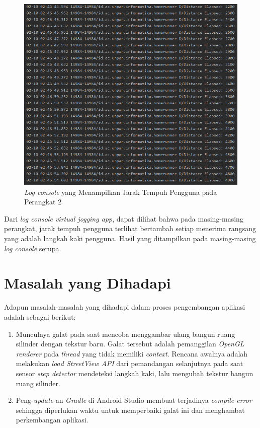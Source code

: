 \begin{figure}[h]
	\centering	\includegraphics[scale=1]
	{Gambar/asus-zenfone-2-exp.png}
	\caption{\textit{Log console} yang Menampilkan Jarak Tempuh Pengguna pada Perangkat 2}
	\label{fig:asus-zenfone-2-exp}
\end{figure}

Dari \textit{log console virtual jogging app}, dapat dilihat bahwa pada masing-masing perangkat, jarak tempuh pengguna terlihat bertambah setiap menerima rangsang yang adalah langkah  kaki pengguna. Hasil yang ditampilkan pada masing-masing \textit{log console} serupa. 


\section{Masalah yang Dihadapi}
Adapun masalah-masalah yang dihadapi dalam proses pengembangan aplikasi adalah sebagai berikut:

\begin{enumerate}
	\item Munculnya galat pada saat mencoba menggambar ulang bangun ruang silinder dengan tekstur baru. Galat tersebut adalah pemanggilan \textit{OpenGL renderer} pada \textit{thread} yang tidak memiliki \textit{context}. Rencana awalnya adalah melakukan \textit{load StreetView API} dari pemandangan selanjutnya pada saat sensor \textit{step detector} mendeteksi langkah kaki, lalu mengubah tekstur bangun ruang silinder. 
	
	\item Peng-\textit{update}-an \textit{Gradle} di Android Studio membuat terjadinya \textit{compile error} sehingga diperlukan waktu untuk memperbaiki galat ini dan menghambat perkembangan aplikasi. 
\end{enumerate}

